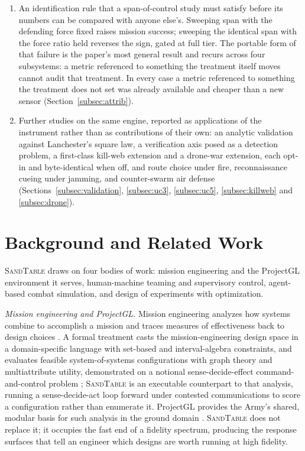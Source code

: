 \documentclass[11pt]{article}
\newcommand{\sandtable}{\textsc{SandTable}}
\begin{document}
\begin{enumerate}
\item An identification rule that a span-of-control study must satisfy before its numbers can be
compared with anyone else's. Sweeping span with the defending force fixed raises mission success;
sweeping the identical span with the force ratio held reverses the sign, gated at full tier. The
portable form of that failure is the paper's most general result and recurs across four subsystems:
a metric referenced to something the treatment itself moves cannot audit that treatment. In every
case a metric referenced to something the treatment does not set was already available and cheaper
than a new sensor (Section~\ref{subsec:attrib}).

\item Further studies on the same engine, reported as applications of the instrument rather than as
contributions of their own: an analytic validation against Lanchester's square law, a verification
axis posed as a detection problem, a first-class kill-web extension and a drone-war extension, each
opt-in and byte-identical when off, and route choice under fire, reconnaissance cueing under
jamming, and counter-swarm air defense (Sections~\ref{subsec:validation}, \ref{subsec:uc3},
\ref{subsec:uc5}, \ref{subsec:killweb} and \ref{subsec:drone}).
\end{enumerate}

\section{Background and Related Work}
\label{sec:related}

\sandtable{} draws on four bodies of work: mission engineering and the ProjectGL environment it serves, human-machine teaming and supervisory control, agent-based combat simulation, and design of experiments with optimization.

\emph{Mission engineering and ProjectGL.} Mission engineering analyzes how systems combine to accomplish a mission and traces measures of effectiveness back to design choices \citep{raz2024mission,raz2024foundations}. A formal treatment casts the mission-engineering design space in a domain-specific language with set-based and interval-algebra constraints, and evaluates feasible system-of-systems configurations with graph theory and multiattribute utility, demonstrated on a notional sense-decide-effect command-and-control problem \citep{raz2024foundations}; \sandtable{} is an executable counterpart to that analysis, running a sense-decide-act loop forward under contested communications to score a configuration rather than enumerate it. ProjectGL provides the Army's shared, modular basis for such analysis in the ground domain \citep{stanko2025projectgl}. \sandtable{} does not replace it; it occupies the fast end of a fidelity spectrum, producing the response surfaces that tell an engineer which designs are worth running at high fidelity.
\end{document}
